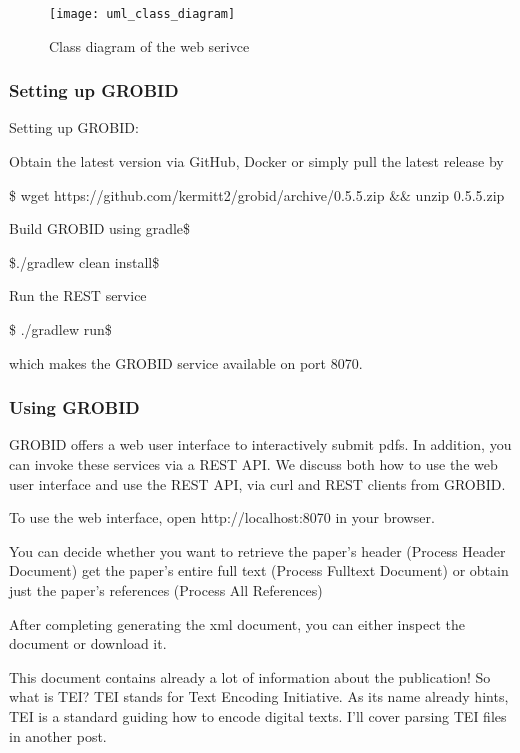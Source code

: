 \documentclass[
10pt, %
a4paper, %
oneside, %
headinclude,footinclude, %
BCOR5mm, %
]{scrartcl}
\begin{document}
\begin{figure}[!hbt]
\centering
\texttt{[image: uml\_class\_diagram]}
\caption{Class diagram of the web serivce}
\label{fig:uml_class_diagram}
\end{figure}


\subsubsection{Setting up GROBID}

Setting up GROBID:

Obtain the latest version via GitHub, Docker or simply pull the latest release by

\$ wget https://github.com/kermitt2/grobid/archive/0.5.5.zip \&\& unzip 0.5.5.zip

Build GROBID using gradle\$

\$./gradlew clean install\$

Run the REST service

\$ ./gradlew run\$

which makes the GROBID service available on port 8070.

\subsubsection{Using GROBID}
GROBID offers a web user interface to interactively submit pdfs. In addition, you can invoke these services via a REST API. We discuss both how to use the web user interface and use the REST API, via curl and REST clients from GROBID.

To use the web interface, open http://localhost:8070 in your browser.

You can decide whether you want to retrieve the paper’s header (Process Header Document) get the paper’s entire full text (Process Fulltext Document) or obtain just the paper’s references (Process All References)

After completing generating the xml document, you can either inspect the document or download it.

This document contains already a lot of information about the publication! So what is TEI? TEI stands for Text Encoding Initiative. As its name already hints, TEI is a standard guiding how to encode digital texts. I’ll cover parsing TEI files in another post.
\end{document}

